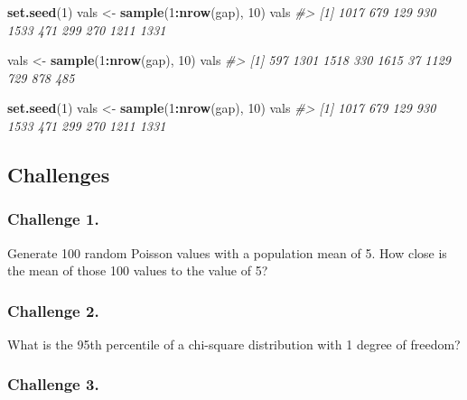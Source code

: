 \documentclass[]{book}
\newenvironment{Shaded}{\begin{snugshade}}{\end{snugshade}}
\newcommand{\KeywordTok}[1]{\textcolor[rgb]{0.13,0.29,0.53}{\textbf{#1}}}
\newcommand{\DecValTok}[1]{\textcolor[rgb]{0.00,0.00,0.81}{#1}}
\newcommand{\StringTok}[1]{\textcolor[rgb]{0.31,0.60,0.02}{#1}}
\newcommand{\CommentTok}[1]{\textcolor[rgb]{0.56,0.35,0.01}{\textit{#1}}}
\newcommand{\OperatorTok}[1]{\textcolor[rgb]{0.81,0.36,0.00}{\textbf{#1}}}
\newcommand{\NormalTok}[1]{#1}
\begin{document}
\begin{Shaded}
\begin{Highlighting}[]
\KeywordTok{set.seed}\NormalTok{(}\DecValTok{1}\NormalTok{)}
\NormalTok{vals <-}\StringTok{ }\KeywordTok{sample}\NormalTok{(}\DecValTok{1}\OperatorTok{:}\KeywordTok{nrow}\NormalTok{(gap), }\DecValTok{10}\NormalTok{)}
\NormalTok{vals}
\CommentTok{#>  [1] 1017  679  129  930 1533  471  299  270 1211 1331}

\NormalTok{vals <-}\StringTok{ }\KeywordTok{sample}\NormalTok{(}\DecValTok{1}\OperatorTok{:}\KeywordTok{nrow}\NormalTok{(gap), }\DecValTok{10}\NormalTok{)}
\NormalTok{vals}
\CommentTok{#>  [1]  597 1301 1518  330 1615   37 1129  729  878  485}

\KeywordTok{set.seed}\NormalTok{(}\DecValTok{1}\NormalTok{)}
\NormalTok{vals <-}\StringTok{ }\KeywordTok{sample}\NormalTok{(}\DecValTok{1}\OperatorTok{:}\KeywordTok{nrow}\NormalTok{(gap), }\DecValTok{10}\NormalTok{)}
\NormalTok{vals}
\CommentTok{#>  [1] 1017  679  129  930 1533  471  299  270 1211 1331}
\end{Highlighting}
\end{Shaded}

\subsection{Challenges}\label{challenges-9}

\subsubsection*{Challenge 1.}\label{challenge-1.-7}

Generate 100 random Poisson values with a population mean of 5. How
close is the mean of those 100 values to the value of 5?

\subsubsection*{Challenge 2.}\label{challenge-2.-6}

What is the 95th percentile of a chi-square distribution with 1 degree
of freedom?

\subsubsection*{Challenge 3.}\label{challenge-3.-4}
\end{document}
